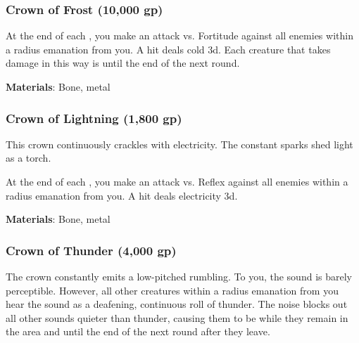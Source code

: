 \lowercase{\hypertarget{item:Crown of Frost}{}}\label{item:Crown of Frost}
\hypertarget{item:Crown of Frost}{\subsubsection{Crown of Frost\hfill{} (10,000 gp)}}

At the end of each , you make an attack vs. Fortitude against all enemies within a \areamed radius emanation from you.
A hit deals cold  \minus3d.
Each creature that takes damage in this way is \fatigued until the end of the next round.



\vspace{0.25em}
\textbf{Materials}: Bone, metal


\lowercase{\hypertarget{item:Crown of Lightning}{}}\label{item:Crown of Lightning}
\hypertarget{item:Crown of Lightning}{\subsubsection{Crown of Lightning\hfill{} (1,800 gp)}}

This crown continuously crackles with electricity.
The constant sparks shed light as a torch.

At the end of each , you make an attack vs. Reflex against all enemies within a \areamed radius emanation from you.
A hit deals electricity  \minus3d.



\vspace{0.25em}
\textbf{Materials}: Bone, metal


\lowercase{\hypertarget{item:Crown of Thunder}{}}\label{item:Crown of Thunder}
\hypertarget{item:Crown of Thunder}{\subsubsection{Crown of Thunder\hfill{} (4,000 gp)}}

The crown constantly emits a low-pitched rumbling.
To you, the sound is barely perceptible.
However, all other creatures within a \arealarge radius emanation from you hear the sound as a deafening, continuous roll of thunder.
The noise blocks out all other sounds quieter than thunder, causing them to be \deafened while they remain in the area and until the end of the next round after they leave.

